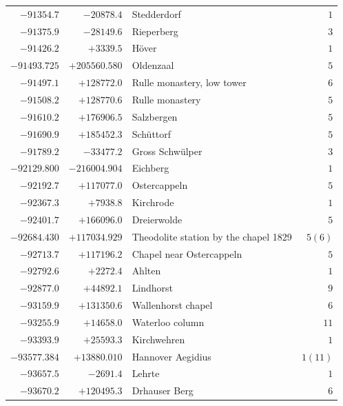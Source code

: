 \begin{center}
\begin{tabular}{r|r|p{170pt}|r}
\(-91354.7\)&\(-20878.4\)&Stedderdorf&\(1\)\\
\(-91375.9\)&\(-28149.6\)&Rieperberg&\(3\)\\
\(-91426.2\)&\(+3339.5\)&Höver&\(1\)\\
\(-91493.725\)&\(+205560.580\)&Oldenzaal&\(5\)\\
\(-91497.1\)&\(+128772.0\)&Rulle monastery, low tower&\(6\)\\
\(-91508.2\)&\(+128770.6\)&Rulle monastery&\(5\)\\
\(-91610.2\)&\(+176906.5\)&Salzbergen&\(5\)\\
\(-91690.9\)&\(+185452.3\)&Schüttorf&\(5\)\\
\(-91789.2\)&\(-33477.2\)&Gross Schwülper&\(3\)\\
\(-92129.800\)&\(-216004.904\)&Eichberg&\(1\)\\
\(-92192.7\)&\(+117077.0\)&Ostercappeln&\(5\)\\
\(-92367.3\)&\(+7938.8\)&Kirchrode&\(1\)\\
\(-92401.7\)&\(+166096.0\)&Dreierwolde&\(5\)\\
\(-92684.430\)&\(+117034.929\)&Theodolite station by the chapel 1829&\(5 (6)\)\\
\(-92713.7\)&\(+117196.2\)&Chapel near Ostercappeln&\(5\)\\
\(-92792.6\)&\(+2272.4\)&Ahlten&\(1\)\\
\(-92877.0\)&\(+44892.1\)&Lindhorst&\(9\)\\
\(-93159.9\)&\(+131350.6\)&Wallenhorst chapel&\(6\)\\
\(-93255.9\)&\(+14658.0\)&Waterloo column&\(11\)\\
\(-93393.9\)&\(+25593.3\)&Kirchwehren&\(1\)\\
\(-93577.384\)&\(+13880.010\)&Hannover Aegidius&\(1(11)\)\\
\(-93657.5\)&\(-2691.4\)&Lehrte&\(1\)\\
\(-93670.2\)&\(+120495.3\)&Drhauser Berg&\(6\)\\
\hline\end{tabular}\endgroup\end{center}
\clearpage
